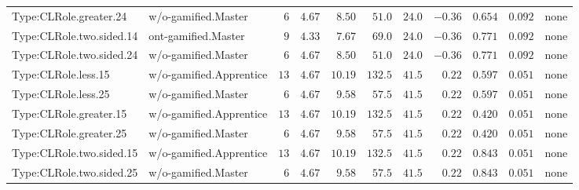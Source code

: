\documentclass[6pt,a4paper]{article}
\begin{document}
{\begin{longtable}{llrrrrrrrrl}
Type:CLRole.greater.24&w/o-gamified.Master&$ 6$&$4.67$&$ 8.50$&$ 51.0$&$ 24.0$&$-0.36$&$0.654$&$0.092$&none\tabularnewline
Type:CLRole.two.sided.14&ont-gamified.Master&$ 9$&$4.33$&$ 7.67$&$ 69.0$&$ 24.0$&$-0.36$&$0.771$&$0.092$&none\tabularnewline
Type:CLRole.two.sided.24&w/o-gamified.Master&$ 6$&$4.67$&$ 8.50$&$ 51.0$&$ 24.0$&$-0.36$&$0.771$&$0.092$&none\tabularnewline
Type:CLRole.less.15&w/o-gamified.Apprentice&$13$&$4.67$&$10.19$&$132.5$&$ 41.5$&$ 0.22$&$0.597$&$0.051$&none\tabularnewline
Type:CLRole.less.25&w/o-gamified.Master&$ 6$&$4.67$&$ 9.58$&$ 57.5$&$ 41.5$&$ 0.22$&$0.597$&$0.051$&none\tabularnewline
Type:CLRole.greater.15&w/o-gamified.Apprentice&$13$&$4.67$&$10.19$&$132.5$&$ 41.5$&$ 0.22$&$0.420$&$0.051$&none\tabularnewline
Type:CLRole.greater.25&w/o-gamified.Master&$ 6$&$4.67$&$ 9.58$&$ 57.5$&$ 41.5$&$ 0.22$&$0.420$&$0.051$&none\tabularnewline
\newpage
Type:CLRole.two.sided.15&w/o-gamified.Apprentice&$13$&$4.67$&$10.19$&$132.5$&$ 41.5$&$ 0.22$&$0.843$&$0.051$&none\tabularnewline
Type:CLRole.two.sided.25&w/o-gamified.Master&$ 6$&$4.67$&$ 9.58$&$ 57.5$&$ 41.5$&$ 0.22$&$0.843$&$0.051$&none\tabularnewline
\hline
\end{longtable}}
\end{document}
